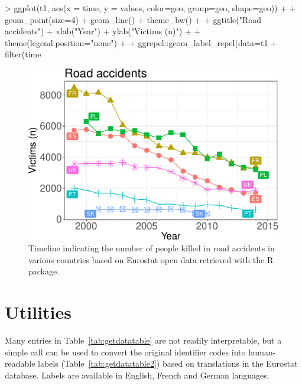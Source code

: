 \begin{example}
> ggplot(t1, aes(x = time, y = values, color=geo, group=geo, shape=geo)) +
+   geom_point(size=4) + geom_line() + theme_bw() +
+   ggtitle("Road accidents") + xlab("Year") + ylab("Victims (n)") +
+   theme(legend.position="none") +
+   ggrepel::geom_label_repel(data=t1 %
+     filter(time %
\end{example}

\begin{figure}[h]
\begin{center}
\includegraphics{2017-manu-roadacc-1}
\end{center}
\caption{Timeline indicating the number of people killed in road accidents in various countries based on Eurostat open data retrieved with the  R package.}
\label{fig:transport}
\end{figure}




\section{Utilities}

Many entries in Table~\ref{tab:getdatatable} are not readily interpretable, but a simple call  can be used to convert the original identifier codes into human-readable labels (Table~\ref{tab:getdatatable2}) based on translations in the Eurostat database. Labels are available in English, French and German languages.

